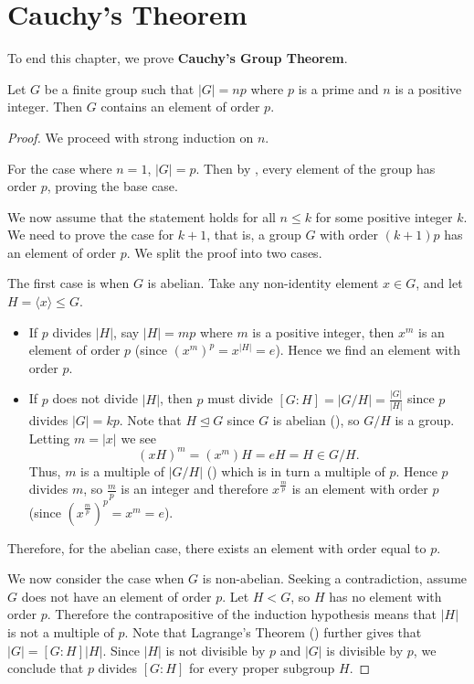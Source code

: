 \section{Cauchy's Theorem}
To end this chapter, we prove \textbf{Cauchy's Group Theorem}.
\begin{theorem}[Cauchy]\label{thrm-cauchy}
    Let $G$ be a finite group such that $|G| = np$ where $p$ is a prime and $n$ is a positive integer. Then $G$ contains an element of order $p$.
\end{theorem}
\begin{proof}
    We proceed with strong induction on $n$.

    For the case where $n = 1$, $|G| = p$. Then by , every element of the group has order $p$, proving the base case.

    We now assume that the statement holds for all $n \leq k$ for some positive integer $k$. We need to prove the case for $k+1$, that is, a group $G$ with order $(k+1)p$ has an element of order $p$. We split the proof into two cases.

    The first case is when $G$ is abelian. Take any non-identity element $x \in G$, and let $H = \langle x \rangle \leq G$.
    \begin{itemize}
        \item If $p$ divides $|H|$, say $|H| = mp$ where $m$ is a positive integer, then $x^m$ is an element of order $p$ (since $\left(x^m\right)^p = x^{|H|} = e$). Hence we find an element with order $p$.
        \item If $p$ does not divide $|H|$, then $p$ must divide $[G:H] = |G/H| = \frac{|G|}{|H|}$ since $p$ divides $|G| = kp$. Note that $H \unlhd G$ since $G$ is abelian (), so $G/H$ is a group. Letting $m = |x|$ we see
        \[
            (xH)^m = (x^m)H = eH = H \in G/H.
        \]
        Thus, $m$ is a multiple of $|G/H|$ () which is in turn a multiple of $p$. Hence $p$ divides $m$, so $\frac mp$ is an integer and therefore $x^{\frac mp}$ is an element with order $p$ (since $\left(x^{\frac mp}\right)^p = x^m = e$).
    \end{itemize}
    Therefore, for the abelian case, there exists an element with order equal to $p$.

    We now consider the case when $G$ is non-abelian. Seeking a contradiction, assume $G$ does not have an element of order $p$. Let $H < G$, so $H$ has no element with order $p$. Therefore the contrapositive of the induction hypothesis means that $|H|$ is not a multiple of $p$. Note that Lagrange's Theorem () further gives that $|G| = [G:H]|H|$. Since $|H|$ is not divisible by $p$ and $|G|$ is divisible by $p$, we conclude that $p$ divides $[G:H]$ for every proper subgroup $H$.


\end{proof}
